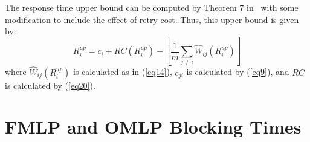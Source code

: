 \documentclass[a4paper,english]{article}
\begin{document}
The response time upper bound can be computed by Theorem 7 in~\cite{key-2} with some modification to include the effect of retry cost. Thus, this upper bound is given by:
\begin{equation}
R_{i}^{up}=c_{i}+RC(R_{i}^{up})+\left\lfloor\frac{1}{m}\sum_{j\ne i}\hat{W}{}_{ij}(R_{i}^{up})\right\rfloor\label{eq22}\end{equation}
where $\hat{W}_{ij}(R_{i}^{up})$ is calculated as in (\ref{eq14}), $c_{ji}$ is calculated by (\ref{eq9}), and $RC$ is calculated by (\ref{eq20}).


\section{FMLP and OMLP Blocking Times}
\label{sec:blocking-bound-fmlp-omlp}
\end{document}
